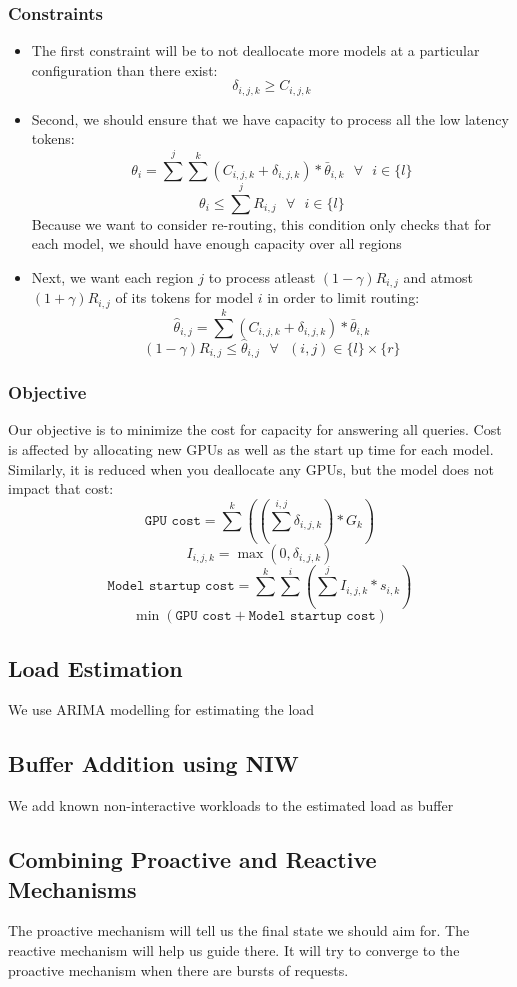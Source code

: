 \subsubsection{Constraints}
\begin{itemize}
    \item The first constraint will be to not deallocate more models at a particular configuration than there exist: $$\delta_{i,j,k} \geq C_{i, j, k}$$
    \item Second, we should ensure that we have capacity to process all the low latency tokens: 
    $$\theta_{i} = \sum^{j}\sum^{k}(C_{i, j, k} + \delta_{i, j, k}) * \bar{\theta}_{i, k} \text{  }\forall\text{ 
 }i\in\{l\}$$
    $$\theta_{i} \leq \sum^{j}R_{i, j} \text{ 
 }\forall\text{  }i\in \{l\}$$ Because we want to consider re-routing, this condition only checks that for each model, we should have enough capacity over all regions
 \item Next, we want each region $j$ to process atleast $(1-\gamma)R_{i, j}$ and atmost $(1+\gamma)R_{i, j}$ of its tokens for model $i$ in order to limit routing:
 $$\hat{\theta}_{i, j} = \sum^{k}(C_{i, j, k} + \delta_{i, j, k}) * \bar{\theta}_{i, k}$$
 $$(1-\gamma)R_{i, j} \leq \hat{\theta}_{i, j} \text{  }\forall\text{  }(i, j)\in\{l\}\times \{r\}$$
\end{itemize}
\subsubsection{Objective}
Our objective is to minimize the cost for capacity for answering all queries. Cost is affected by allocating new GPUs as well as the start up time for each model. Similarly, it is reduced when you deallocate any GPUs, but the model does not impact that cost:
$$\texttt{GPU cost} = \sum^{k}((\sum^{i, j}\delta_{i, j, k}) * G_{k})$$
$$I_{i, j, k} = \max(0, \delta_{i, j, k})$$
$$\texttt{Model startup cost} = \sum^{k}\sum^{i}(\sum^{j}I_{i, j, k} * s_{i, k})$$
$$\min (\texttt{GPU cost} + \texttt{Model startup cost})$$
\subsection{Load Estimation}
We use ARIMA modelling for estimating the load
\subsection{Buffer Addition using NIW}
We add known non-interactive workloads to the estimated load as buffer
\subsection{Combining Proactive and Reactive Mechanisms}
The proactive mechanism will tell us the final state we should aim for. The reactive mechanism will help us guide there. It will try to converge to the proactive mechanism when there are bursts of requests.

